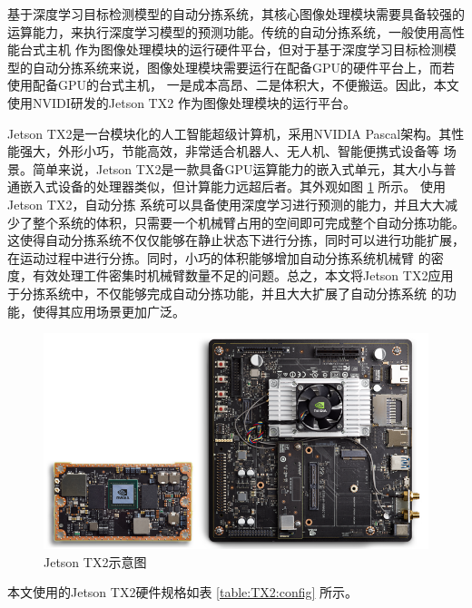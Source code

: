 基于深度学习目标检测模型的自动分拣系统，其核心图像处理模块需要具备较强的运算能力，来执行深度学习模型的预测功能。传统的自动分拣系统，一般使用高性能台式主机
作为图像处理模块的运行硬件平台，但对于基于深度学习目标检测模型的自动分拣系统来说，图像处理模块需要运行在配备GPU的硬件平台上，而若使用配备GPU的台式主机，
一是成本高昂、二是体积大，不便搬运。因此，本文使用NVIDI研发的Jetson TX2 \cite{TX2} 作为图像处理模块的运行平台。

Jetson TX2是一台模块化的人工智能超级计算机，采用NVIDIA Pascal架构。其性能强大，外形小巧，节能高效，非常适合机器人、无人机、智能便携式设备等
场景。简单来说，Jetson TX2是一款具备GPU运算能力的嵌入式单元，其大小与普通嵌入式设备的处理器类似，但计算能力远超后者。其外观如图 \ref{fig:jetson_tx2} 所示。
使用Jetson TX2，自动分拣
系统可以具备使用深度学习进行预测的能力，并且大大减少了整个系统的体积，只需要一个机械臂占用的空间即可完成整个自动分拣功能。
这使得自动分拣系统不仅仅能够在静止状态下进行分拣，同时可以进行功能扩展，在运动过程中进行分拣。同时，小巧的体积能够增加自动分拣系统机械臂
的密度，有效处理工件密集时机械臂数量不足的问题。总之，本文将Jetson TX2应用于分拣系统中，不仅能够完成自动分拣功能，并且大大扩展了自动分拣系统
的功能，使得其应用场景更加广泛。

\begin{figure}[h]
    \centering
    \includegraphics[width=\textwidth]{pic/chap2/jetson_tx2.jpg}
    \caption{Jetson TX2示意图}
    \label{fig:jetson_tx2}
\end{figure}

本文使用的Jetson TX2硬件规格如表 \ref{table:TX2:config} 所示。

